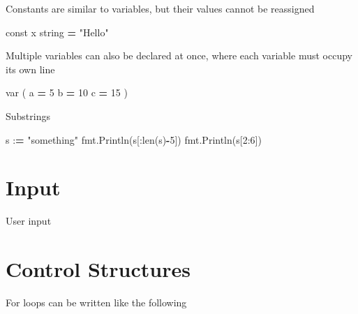 \documentclass[]{book}
\newenvironment{Shaded}{\begin{snugshade}}{\end{snugshade}}
\newcommand{\DecValTok}[1]{\textcolor[rgb]{0.00,0.00,0.81}{#1}}
\newcommand{\SpecialCharTok}[1]{\textcolor[rgb]{0.00,0.00,0.00}{#1}}
\newcommand{\StringTok}[1]{\textcolor[rgb]{0.31,0.60,0.02}{#1}}
\newcommand{\OperatorTok}[1]{\textcolor[rgb]{0.81,0.36,0.00}{\textbf{#1}}}
\newcommand{\BuiltInTok}[1]{#1}
\newcommand{\NormalTok}[1]{#1}
\begin{document}
Constants are similar to variables, but their values cannot be
reassigned

\begin{Shaded}
\begin{Highlighting}[]
\NormalTok{const x string }\OperatorTok{=} \StringTok{"Hello"}
\end{Highlighting}
\end{Shaded}

Multiple variables can also be declared at once, where each variable
must occupy its own line

\begin{Shaded}
\begin{Highlighting}[]
\NormalTok{var (}
\NormalTok{    a }\OperatorTok{=} \DecValTok{5}
\NormalTok{    b }\OperatorTok{=} \DecValTok{10}
\NormalTok{    c }\OperatorTok{=} \DecValTok{15}
\NormalTok{)}
\end{Highlighting}
\end{Shaded}

Substrings

\begin{Shaded}
\begin{Highlighting}[]
\NormalTok{s :}\OperatorTok{=} \StringTok{"something"}
\NormalTok{fmt.Println(s[:}\BuiltInTok{len}\NormalTok{(s)}\OperatorTok{-}\DecValTok{5}\NormalTok{])}
\NormalTok{fmt.Println(s[}\DecValTok{2}\NormalTok{:}\DecValTok{6}\NormalTok{])}
\end{Highlighting}
\end{Shaded}

\section{Input}\label{input}

User input

\begin{Shaded}
\end{Shaded}

\section{Control Structures}\label{control-structures}

For loops can be written like the following
\end{document}
